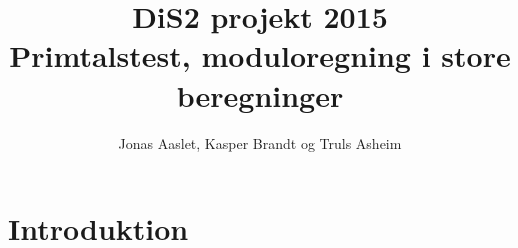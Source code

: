 \documentclass[a4paper]{article}
\title{DiS2 projekt 2015\\Primtalstest, moduloregning i store beregninger}
\author{Jonas Aaslet, Kasper Brandt og Truls Asheim}
\begin{document}
\begin{titlepage}
\maketitle
\end{titlepage}


\section{Introduktion}




\end{document}
